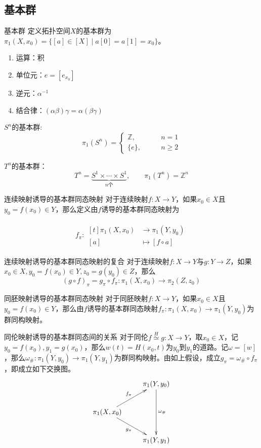 \documentclass[lang = cn, scheme = chinese, thmcnt = section, usesamecnt]{elegantbook}
\newcommand{\Z}{\mathbb{Z}}            %
\newcommand{\function}[5]{
	\begin{align*}
		#1:\begin{aligned}[t]
			#2 &\longrightarrow #3\\
			#4 &\longmapsto #5
		\end{aligned}
	\end{align*}
}                                     %
\begin{document}
\subsection{基本群}

\begin{definition}{基本群}
	定义拓扑空间$X$的基本群为$\pi_1(X,x_0)=\{ [a]\in[X]\mid a[0]=a[1]=x_0 \}$。
	\begin{enumerate}
		\item 运算：积
		\item 单位元：$e=[e_{x_0}]$
		\item 逆元：$\alpha^{-1}$
		\item 结合律：$(\alpha\beta)\gamma=\alpha(\beta\gamma)$
	\end{enumerate}
\end{definition}

\begin{example}
	$S^n$​的基本群:
	$$
	\pi_1(S^n)=\begin{cases}
		\Z,\qquad & n=1\\
		\{e\},\qquad & n\ge 2
	\end{cases}
	$$
\end{example}

\begin{example}
	$T^n$的基本群：%
	$$
	T^n=\underbrace{S^1\times \cdots\times S^1}_{n\text{个}},\qquad \pi_1(T^n)=\Z^n
	$$
\end{example}

\begin{definition}{连续映射诱导的基本群同态映射}
	对于连续映射$f:X\to Y$，如果$x_0\in X$且$y_0=f(x_0)\in Y$，那么定义由$f$诱导的基本群同态映射为
	\function{f_\pi}{\pi_1(X,x_0)}{\pi_1(Y,y_0)}{[a]}{[f\circ a]}
\end{definition}

\begin{theorem}{连续映射诱导的基本群同态映射的复合}
	对于连续映射$f:X\to Y$与$g:Y\to Z$，如果$x_0\in X,y_0=f(x_0)\in Y,z_0=g(y_0)\in Z$，那么%
	$$
	(g\circ f)_\pi=g_\pi\circ f_\pi:\pi_1(X,x_0)\to \pi_2(Z,z_0)
	$$
\end{theorem}

\begin{theorem}{同胚映射诱导的基本群同态映射}
	对于同胚映射$f:X\to Y$，如果$x_0\in X$且$y_0=f(x_0)\in Y$，那么由$f$诱导的基本群同态映射$f_\pi:\pi_1(X,x_0)\to\pi_1(Y,y_0)$为群同构映射。
\end{theorem}

\begin{theorem}{同伦映射诱导的基本群同态间的关系}
	对于同伦$f\overset{H}{\simeq}g:X\to Y$，取$x_0\in X$，记$y_0=f(x_0),y_1=g(x_0)$，那么$w(t)=H(x_0,t)$为$y_0$到$y_1$的道路。记$\omega=[w]$，那么$\omega_{\#}:\pi_1(Y,y_0)\to\pi_1(Y,y_1)$为群同构映射。由如上假设，成立$g_\pi=\omega_{\#}\circ f_{\pi}$，即成立如下交换图。
	$$
	\xymatrix{
		& \pi_1(Y,y_0) \ar[dd]^{\omega_{\#}} \\
		\pi_1(X,x_0)\ar[ur]^{f_\pi} \ar[dr]_{g_\pi} &\\
		& \pi_1(Y,y_1)
	}
	$$
\end{theorem}
\end{document}
